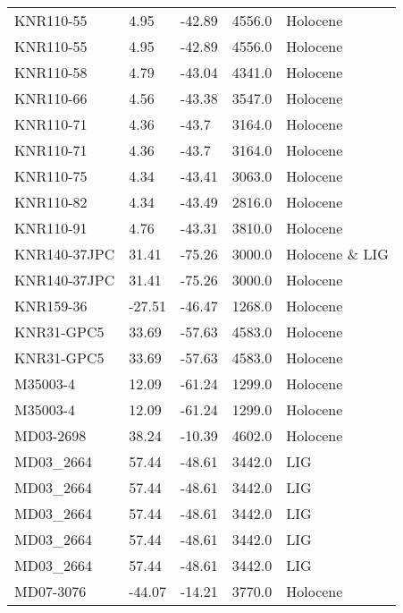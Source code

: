 \begin{longtable}{lllrl}
        KNR110-55 &     4.95 &    -42.89 &     4556.0 &        Holocene \\
        KNR110-55 &     4.95 &    -42.89 &     4556.0 &        Holocene \\
        KNR110-58 &     4.79 &    -43.04 &     4341.0 &        Holocene \\
        KNR110-66 &     4.56 &    -43.38 &     3547.0 &        Holocene \\
        KNR110-71 &     4.36 &     -43.7 &     3164.0 &        Holocene \\
        KNR110-71 &     4.36 &     -43.7 &     3164.0 &        Holocene \\
        KNR110-75 &     4.34 &    -43.41 &     3063.0 &        Holocene \\
        KNR110-82 &     4.34 &    -43.49 &     2816.0 &        Holocene \\
        KNR110-91 &     4.76 &    -43.31 &     3810.0 &        Holocene \\
     KNR140-37JPC &    31.41 &    -75.26 &     3000.0 &  Holocene \& LIG \\
     KNR140-37JPC &    31.41 &    -75.26 &     3000.0 &        Holocene \\
        KNR159-36 &   -27.51 &    -46.47 &     1268.0 &        Holocene \\
       KNR31-GPC5 &    33.69 &    -57.63 &     4583.0 &        Holocene \\
       KNR31-GPC5 &    33.69 &    -57.63 &     4583.0 &        Holocene \\
         M35003-4 &    12.09 &    -61.24 &     1299.0 &        Holocene \\
         M35003-4 &    12.09 &    -61.24 &     1299.0 &        Holocene \\
        MD03-2698 &    38.24 &    -10.39 &     4602.0 &        Holocene \\
        MD03\_2664 &    57.44 &    -48.61 &     3442.0 &             LIG \\
        MD03\_2664 &    57.44 &    -48.61 &     3442.0 &             LIG \\
        MD03\_2664 &    57.44 &    -48.61 &     3442.0 &             LIG \\
        MD03\_2664 &    57.44 &    -48.61 &     3442.0 &             LIG \\
        MD03\_2664 &    57.44 &    -48.61 &     3442.0 &             LIG \\
        MD07-3076 &   -44.07 &    -14.21 &     3770.0 &        Holocene \\

\end{longtable}
